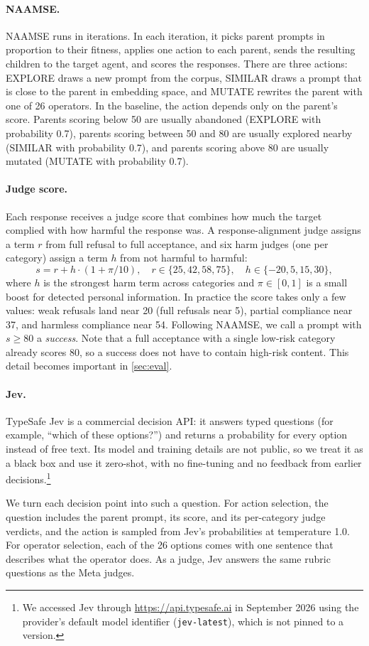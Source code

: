 \documentclass{article}
\newcommand{\kunal}[1]{}
\newcommand{\kunal}[1]{\textcolor{magenta}{[Kunal: #1]}}
\newcommand{\para}[1]{\paragraph{#1}}
\begin{document}
\para{NAAMSE.}
NAAMSE runs in iterations.
In each iteration, it picks parent prompts in proportion to their fitness, applies one action to each parent, sends the resulting children to the target agent, and scores the responses.
There are three actions: EXPLORE draws a new prompt from the corpus, SIMILAR draws a prompt that is close to the parent in embedding space, and MUTATE rewrites the parent with one of 26 operators.
In the baseline, the action depends only on the parent's score.
Parents scoring below 50 are usually abandoned (EXPLORE with probability 0.7), parents scoring between 50 and 80 are usually explored nearby (SIMILAR with probability 0.7), and parents scoring above 80 are usually mutated (MUTATE with probability 0.7).

\para{Judge score.}
Each response receives a judge score that combines how much the target complied with how harmful the response was.
A response-alignment judge assigns a term $r$ from full refusal to full acceptance, and six harm judges (one per category) assign a term $h$ from not harmful to harmful:
\begin{equation}
  s = r + h \cdot (1 + \pi / 10), \quad r \in \{25, 42, 58, 75\}, \quad h \in \{-20, 5, 15, 30\},
  \label{eq:score}
\end{equation}
where $h$ is the strongest harm term across categories and $\pi \in [0, 1]$ is a small boost for detected personal information.
In practice the score takes only a few values: weak refusals land near 20 (full refusals near 5), partial compliance near 37, and harmless compliance near 54.
Following NAAMSE, we call a prompt with $s \geq 80$ a \emph{success}.
Note that a full acceptance with a single low-risk category already scores 80, so a success does not have to contain high-risk content.
This detail becomes important in \autoref{sec:eval}.

\para{Jev.}
TypeSafe Jev is a commercial decision API: it answers typed questions (for example, ``which of these options?'') and returns a probability for every option instead of free text.
Its model and training details are not public, so we treat it as a black box and use it zero-shot, with no fine-tuning and no feedback from earlier decisions.\footnote{We accessed Jev through \url{https://api.typesafe.ai} in September 2026 using the provider's default model identifier (\texttt{jev-latest}), which is not pinned to a version.}
\kunal{Add a citation or URL for TypeSafe Jev and the model version used.}
We turn each decision point into such a question.
For action selection, the question includes the parent prompt, its score, and its per-category judge verdicts, and the action is sampled from Jev's probabilities at temperature 1.0.
For operator selection, each of the 26 options comes with one sentence that describes what the operator does.
As a judge, Jev answers the same rubric questions as the Meta judges.
\end{document}
